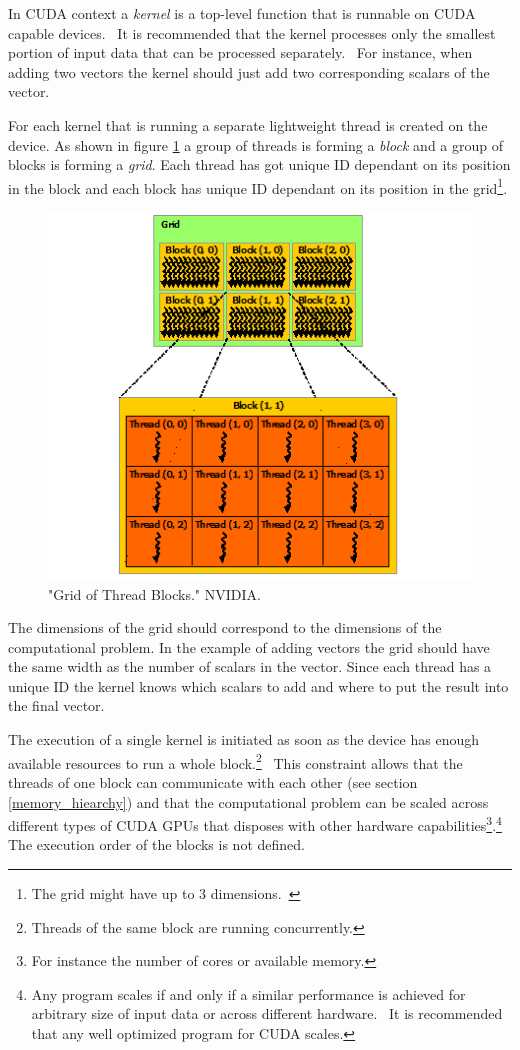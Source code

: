 \documentclass[12pt,twoside]{fithesis2}
\begin{document}
In CUDA context a \emph{kernel} is a top-level function that is runnable on CUDA capable devices.~\cite{cuda_guide} It is recommended that the kernel processes only the smallest portion of input data that can be processed separately.~\cite{data_parallel_algorithms} For instance, when adding two vectors the kernel should just add two corresponding scalars of the vector.

For each kernel that is running a separate lightweight thread is created on the device. As shown in figure \ref{fig:grid} a group of threads is forming a \emph{block} and a group of blocks is forming a \emph{grid}. Each thread has got unique ID dependant on its position in the block and each block has unique ID dependant on its position in the grid\footnote{The grid might have up to 3 dimensions.~\cite{cuda_guide}}.

\begin{figure}[H]
	\centering
	\includegraphics[scale=0.9]{figures/grid-of-thread-blocks.png}
	\caption{"Grid of Thread Blocks." NVIDIA. \cite{cuda_guide}}
	\label{fig:grid}
\end{figure}

The dimensions of the grid should correspond to the dimensions of the computational problem. In the example of adding vectors the grid should have the same width as the number of scalars in the vector. Since each thread has a unique ID the kernel knows which scalars to add and where to put the result into the final vector.

The execution of a single kernel is initiated as soon as the device has enough available resources to run a whole block.\footnote{Threads of the same block are running concurrently.}~\cite{cuda_guide} This constraint allows that the threads of one block can communicate with each other (see section \ref{memory_hiearchy}) and that the computational problem can be scaled across different types of CUDA GPUs that disposes with other hardware capabilities\footnote{For instance the number of cores or available memory.}.\footnote{Any program scales if and only if a similar performance is achieved for arbitrary size of input data or across different hardware.~\cite{cuda_best_practices} It is recommended that any well optimized program for CUDA scales.} The execution order of the blocks is not defined.
\end{document}
